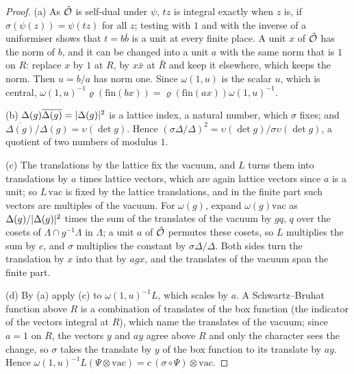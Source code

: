 \begin{proof}
(a) As $\hat{\mathcal{O}}$ is self-dual under $\psi$, $tz$ is integral exactly when $z$ is, if $\sigma(\psi(z))=\psi(tz)$ for all $z$; testing with $1$ and with the inverse of a uniformiser shows that $t=b\bar b$ is a unit at every finite place. A unit $x$ of $\hat{\mathcal{O}}$ has the norm of $b$, and it can be changed into a unit $a$ with the same norm that is $1$ on $R$:
replace $x$ by $1$ at $R$, by $x\bar x$ at $\bar R$ and keep it elsewhere, which keeps the norm. Then $u=b/a$ has norm one. Since $\omega(1,u)$ is the scalar $u$, which is central, $\omega(1,u)^{-1}\varrho(\mathrm{fin}(bx))=\varrho(\mathrm{fin}(ax))\omega(1,u)^{-1}$.

(b) $\Delta(g)\overline{\Delta(g)}=\lvert \Delta(g)\rvert^2$ is a lattice index, a natural number, which $\sigma$ fixes; and $\overline{\Delta(g)}/\Delta(g)=\upsilon(\det g)$. Hence $(\sigma\Delta/\Delta)^2=\upsilon(\det g)/\sigma\upsilon(\det g)$, a quotient of two numbers of modulus $1$.

(c) The translations by the lattice fix the vacuum, and $L$ turns them into translations by $a$ times lattice vectors, which are again lattice vectors since $a$ is a unit; so $L\,\mathrm{vac}$ is fixed by the lattice translations, and in the finite part such vectors are multiples of the vacuum. For $\omega(g)$, expand $\omega(g)\mathrm{vac}$ as
$\Delta(g)/\lvert \Delta(g)\rvert^2$ times the sum of the translates of the vacuum by $gq$, $q$ over the cosets of $\Lambda\cap g^{-1}\Lambda$ in $\Lambda$; a unit $a$ of $\hat{\mathcal{O}}$ permutes these cosets, so $L$ multiplies the sum by $c$, and $\sigma$ multiplies the constant by $\sigma\Delta/\Delta$. Both sides turn the translation by $x$ into that by $agx$, and the
translates of the vacuum span the finite part.

(d) By (a) apply (c) to $\omega(1,u)^{-1}L$, which scales by $a$. A Schwartz--Bruhat function above $R$ is a combination of translates of the box function (the indicator of the vectors integral at $R$), which name the translates of the vacuum; since $a=1$ on $R$, the vectors $y$ and $ay$ agree above $R$ and only the
character sees the change, so $\sigma$ takes the translate by $y$ of the box function to its translate by $ay$. Hence $\omega(1,u)^{-1}L(\Psi\otimes\mathrm{vac})=c\,(\sigma\circ\Psi)\otimes\mathrm{vac}$.
\end{proof}

